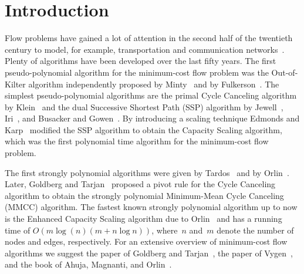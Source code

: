 \documentclass[11pt]{article}
\begin{document}
\section{Introduction}

Flow problems have gained a lot of attention in the second half of the twentieth century to model, for example, transportation and communication networks~\cite{DBLP:books/daglib/0069809,ForFul62}. Plenty of algorithms have been developed over the last fifty years. The first pseudo-polynomial algorithm for the minimum-cost flow problem was the Out-of-Kilter algorithm independently proposed by Minty~\cite{Min60} and by Fulkerson~\cite{Ful61}. The simplest pseudo-polynomial algorithms are the primal Cycle Canceling algorithm by Klein~\cite{Kle67} and the dual Successive Shortest Path (SSP) algorithm by Jewell~\cite{Jew62}, Iri~\cite{Iri60}, and Busacker and Gowen~\cite{BusGow60}. By introducing a scaling technique Edmonds and Karp~\cite{DBLP:journals/jacm/EdmondsK72} modified the SSP algorithm to obtain the Capacity Scaling algorithm, which was the first polynomial time algorithm for the minimum-cost flow problem.

The first strongly polynomial algorithms were given by Tardos~\cite{DBLP:journals/combinatorica/Tardos85} and by Orlin~\cite{Orl84}. Later,
Goldberg and Tarjan~\cite{DBLP:journals/jacm/GoldbergT89} proposed a pivot rule for the Cycle Canceling algorithm to obtain the strongly
polynomial Minimum-Mean Cycle Canceling (MMCC) algorithm. The fastest known strongly polynomial algorithm up to now is the Enhanced Capacity
Scaling algorithm due to Orlin~\cite{Orl93} and has a running time of $O(m \log(n) (m + n\log n))$, where~$n$ and~$m$ denote the number of nodes and edges, respectively. For an extensive overview of
minimum-cost flow algorithms we suggest the paper of Goldberg and Tarjan~\cite{GolTar90}, the paper of Vygen~\cite{Vyg02}, and the book of
Ahuja, Magnanti, and Orlin~\cite{DBLP:books/daglib/0069809}.
\end{document}
